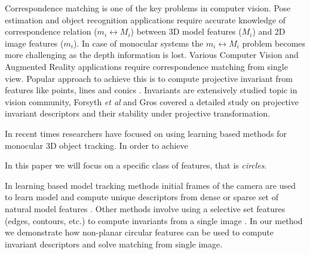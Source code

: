 \documentclass{bmvc2k}
\def\etal{\emph{et al}\bmvaOneDot}
\begin{document}
Correspondence matching is one of the key problems in computer vision. Pose estimation and object recognition applications require accurate knowledge of correspondence relation ($ m_i \leftrightarrow M_i $) between 3D model features ($ M_i $) and 2D image features ($ m_i $). 
In case of monocular systems the $ m_i \leftrightarrow M_i $ problem becomes more challenging as the depth information is lost.
Various Computer Vision and Augmented Reality applications require correspondence matching from single view. Popular approach to achieve this is to compute projective invariant from features like points, lines and conics \cite{hartley_multiple_2003}. 
Invariants are extensively studied topic in vision community, Forsyth \etal \cite{forsyth_91} and Gros \cite{gros_projective_1992} covered a detailed study on projective invariant descriptors and their stability under projective transformation.


In recent times researchers have focused on using learning based methods for monocular 3D object tracking. 
In order to achieve 


In this paper we will focus on a specific class of features, that is \textit{circles}. 

In learning based model tracking methods initial frames of the camera are used to learn model and compute unique descriptors from dense or sparse set of natural model features \cite{chekhlov_ninja_2007} \cite{hinterstoisser_n3m:_2007} \cite{lowe_object_1999}. Other methods involve using a selective set features (edges, contours, etc.) to compute invariants from a single image \cite{lepetit_monocular_2005}. In our method we demonstrate how non-planar circular features can be used to compute invariant descriptors and solve matching from single image. 

\end{document}
